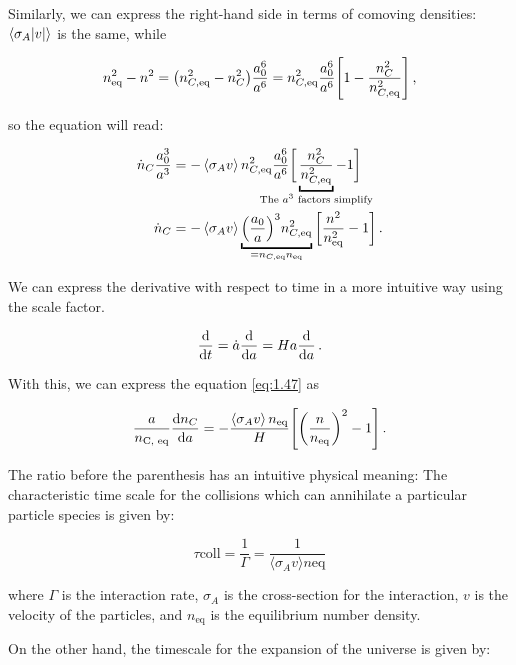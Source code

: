 Similarly, we can express the right-hand side in terms of comoving densities: \(\expval{\sigma_A \abs{v}}\) is the same, while 

\begin{align}
    n _{\text{eq}}^2 - n^2 = \qty(n _{C, \text{eq}}^2 - n_C^2) \frac{a_0^{6}}{a^{6}} = n _{C, \text{eq}}^2 \frac{a_0^{6}}{a^{6}} \qty[1 - \frac{n_C^2}{n _{C, \text{eq}}^2}]\,,
\end{align}

so the equation will read:

\begin{align}
    \dot{n}_C \frac{a_0^3}{a^3} &= -\expval{\sigma _A v} n _{C, \text{eq}}^2 \frac{a_0^{6}}{a^{6}} \bigg[\underbracket{\frac{n_C^2}{n _{C, \text{eq}}^2}}_{\mathclap{\text{The \(a^3\) factors simplify}}} - 1\bigg] \\
    \dot{n}_C &= - \expval{\sigma _A v } \underbracket{\qty(\frac{a_0 }{a})^3 n _{C, \text{eq}}^2}_{ = n_{C, \text{eq}} n _{\text{eq}}} \qty[\frac{n^2}{n _{ \text{eq}}^2} - 1] \,.\label{eq:1.47}
\end{align}

We can express the derivative with respect to time in a more intuitive way using the scale factor.

\begin{align}
\dv{}{t} = \dot{a}\dv{}{a} = H a \dv{}{a}
\,.
\end{align}

With this, we can express the equation \ref{eq:1.47} as

\begin{align}
    \frac{a}{n _{\text{C, eq}}} \dv{n_C}{a} = - \frac{\expval{\sigma _A v }n _{\text{eq}}}{H} \qty[\qty(\frac{n}{n _{\text{eq}}})^2- 1]\,. \label{eq:1.49}
\end{align}

The ratio before the parenthesis has an intuitive physical meaning:
The characteristic time scale for the collisions which can annihilate a particular particle species is given by:

\begin{equation}
\tau {\text{coll}} = \frac{1}{\Gamma} = \frac{1}{\langle \sigma_A v \rangle n{\text{eq}}}
\end{equation}

where $\Gamma$ is the interaction rate, $\sigma_A$ is the cross-section for the interaction, $v$ is the velocity of the particles, and $n_{\text{eq}}$ is the equilibrium number density.

On the other hand, the timescale for the expansion of the universe is given by:

